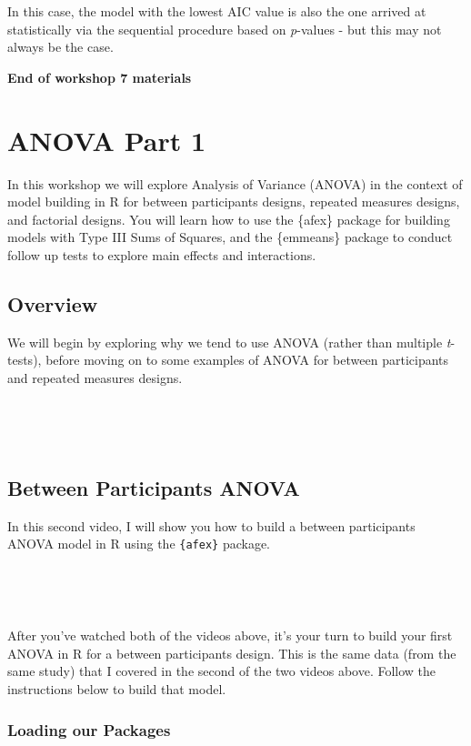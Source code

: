 \documentclass[
]{book}
\begin{document}
In this case, the model with the lowest AIC value is also the one arrived at statistically via the sequential procedure based on \emph{p}-values - but this may not always be the case.

\textbf{End of workshop 7 materials}

\hypertarget{anova-part-1}{%
\chapter{ANOVA Part 1}\label{anova-part-1}}

In this workshop we will explore Analysis of Variance (ANOVA) in the context of model building in R for between participants designs, repeated measures designs, and factorial designs. You will learn how to use the \{afex\} package for building models with Type III Sums of Squares, and the \{emmeans\} package to conduct follow up tests to explore main effects and interactions.

\hypertarget{overview-3}{%
\section{Overview}\label{overview-3}}

We will begin by exploring why we tend to use ANOVA (rather than multiple \emph{t}-tests), before moving on to some examples of ANOVA for between participants and repeated measures designs.

~~

~~

\hypertarget{between-participants-anova}{%
\section{Between Participants ANOVA}\label{between-participants-anova}}

In this second video, I will show you how to build a between participants ANOVA model in R using the \texttt{\{afex\}} package.

~~

~~

After you've watched both of the videos above, it's your turn to build your first ANOVA in R for a between participants design. This is the same data (from the same study) that I covered in the second of the two videos above. Follow the instructions below to build that model.

\hypertarget{loading-our-packages}{%
\subsection{Loading our Packages}\label{loading-our-packages}}
\end{document}
